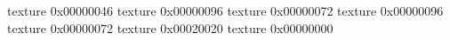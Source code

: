 texture 0x00000046
texture 0x00000096
texture 0x00000072
texture 0x00000096
texture 0x00000072
texture 0x00020020
texture 0x00000000
